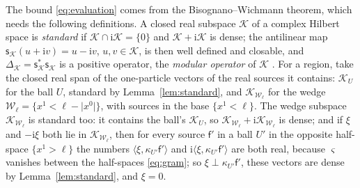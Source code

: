 \documentclass[aps,prl,reprint,longbibliography,raggedbottom]{revtex4-2}
\newcommand{\ii}{\mathrm i}
\newcommand{\abs}[1]{\lvert #1\rvert}
\newcommand{\ip}[2]{\langle #1,#2\rangle}
\newcommand{\sy}{\mathsf f'}
\begin{document}
The bound \eqref{eq:evaluation} comes from the
Bisognano--Wichmann theorem, which needs the following definitions.
A closed real
subspace $\mathcal K$ of a complex Hilbert space is \emph{standard} if
$\mathcal K\cap\ii\mathcal K=\{0\}$ and $\mathcal K+\ii\mathcal K$ is
dense; the antilinear map $\mathsf s_{\mathcal K}(u+\ii v)=u-\ii v$,
$u,v\in\mathcal K$, is then well defined and closable, and
$\Delta_{\mathcal K}=\mathsf s_{\mathcal K}^*\mathsf s_{\mathcal K}$
is a positive operator, the \emph{modular operator} of $\mathcal K$
\cite{RvD77}. For a region, take the closed real span of the
one-particle vectors of the real sources it contains: $\mathcal K_U$
for the ball $U$, standard by Lemma~\ref{lem:standard}, and
$\mathcal K_{\mathcal W_\ell}$ for the wedge
$\mathcal W_\ell=\{x^1<\ell-\abs{x^0}\}$, with sources in the base
$\{x^1<\ell\}$. The wedge subspace $\mathcal K_{\mathcal W_\ell}$
is standard too: it contains the ball's
$\mathcal K_U$, so
$\mathcal K_{\mathcal W_\ell}+\ii\mathcal K_{\mathcal W_\ell}$ is
dense; and if $\xi$ and $-\ii\xi$ both lie in
$\mathcal K_{\mathcal W_\ell}$, then for every source $\sy$ in a ball
$U'$ in the opposite half-space $\{x^1>\ell\}$ the numbers
$\ip\xi{\kappa_{U'}\sy}$ and $\ii\ip\xi{\kappa_{U'}\sy}$ are both
real, because $\varsigma$ vanishes between the half-spaces
\eqref{eq:gram}; so $\xi\perp\kappa_{U'}\sy$, these vectors are dense
by Lemma~\ref{lem:standard}, and $\xi=0$.
\end{document}

